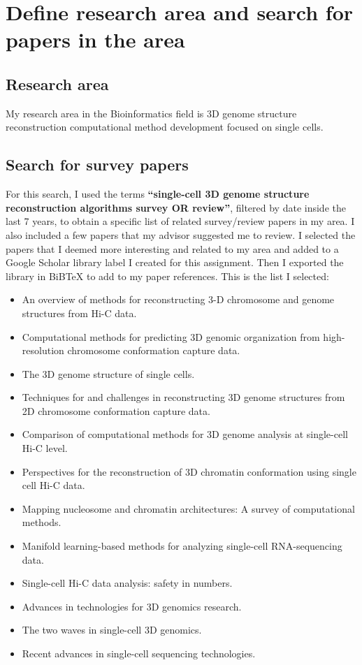\section{Define research area and search for papers in the area}

\subsection{Research area}
My research area in the Bioinformatics field is 3D genome structure reconstruction computational method development focused on single cells.

\subsection{Search for survey papers}
For this search, I used the terms \textbf{``single-cell 3D genome structure reconstruction algorithms survey OR review''}, filtered by date inside the last 7 years, to obtain a specific list of related survey/review papers in my area. I also included a few papers that my advisor suggested me to review. I selected the papers that I deemed more interesting and related to my area and added to a Google Scholar library label I created for this assignment. Then I exported the library in BiBTeX to add to my paper references. This is the list I selected:
\begin{itemize}
    \item \cite{oluwadare2019overview} An overview of methods for reconstructing 3-D chromosome and genome structures from Hi-C data.
    \item \cite{mackay2020computational} Computational methods for predicting 3D genomic organization from high-resolution chromosome conformation capture data.
    \item \cite{zhou20213d} The 3D genome structure of single cells.
    \item \cite{li2023techniques} Techniques for and challenges in reconstructing 3D genome structures from 2D chromosome conformation capture data.
    \item \cite{li2020comparison} Comparison of computational methods for 3D genome analysis at single-cell Hi-C level.
    \item \cite{kos2021perspectives} Perspectives for the reconstruction of 3D chromatin conformation using single cell Hi-C data.
    \item \cite{fang2022mapping} Mapping nucleosome and chromatin architectures: A survey of computational methods.
    \item \cite{moon2018manifold} Manifold learning-based methods for analyzing single-cell RNA-sequencing data.
    \item \cite{galitsyna2021single} Single-cell Hi-C data analysis: safety in numbers.
    \item \cite{zhang2020advances} Advances in technologies for 3D genomics research.
    \item \cite{ulianov2022two} The two waves in single-cell 3D genomics.
    \item \cite{wen2022recent} Recent advances in single-cell sequencing technologies.
\end{itemize}